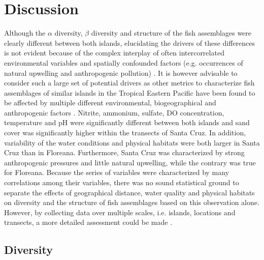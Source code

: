 \section{Discussion}
\label{Discussion}

Although the $\alpha$ diversity, $\beta$ diversity and structure of the fish assemblages were clearly different between both islands, elucidating the drivers of these differences is not evident because of the complex interplay of often intercorrelated environmental variables and spatially confounded factors (e.g. occurrences of natural upwelling and anthropogenic pollution) \citep{Legendre2012NumericalEcology,Robinson2011PushingOpportunities}. It is however advisable to consider such a large set of potential drivers as other metrics to characterize fish assemblages of similar islands in the Tropical Eastern Pacific have been found to be affected by multiple different environmental, biogeographical and anthropogenic factors \citep{Luiz2015CommunityVariables,Quimbayo2019DeterminantsIslands,Quimbayo2017UnusualPacific}. Nitrite, ammonium, sulfate, DO concentration, temperature and pH were significantly different between both islands and sand cover was significantly higher within the transects of Santa Cruz. In addition, variability of the water conditions and physical habitats were both larger in Santa Cruz than in Floreana. Furthermore, Santa Cruz was characterized by strong anthropogenic pressures and little natural upwelling, while the contrary was true for Floreana. Because the series of variables were characterized by many correlations among their variables, there was no sound statistical ground to separate the effects of geographical distance, water quality and physical habitats on diversity and the structure of fish assemblages based on this observation alone. However, by collecting data over multiple scales, i.e. islands, locations and transects, a more detailed assessment could be made \citep{Yackulic2016}.

\subsection{Diversity}

